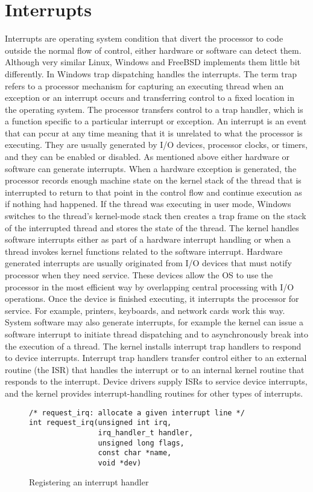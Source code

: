 \documentclass[letterpaper,10pt,draftclsnofoot,onecolumn]{IEEEtran}
\begin{document}
\section*{Interrupts}
Interrupts are operating system condition that divert the processor to code outside the normal flow of control, either hardware or software can detect them. Although very similar Linux, Windows and FreeBSD implements them little bit differently. 
In Windows trap dispatching handles the interrupts. The term trap refers to a processor mechanism for capturing an executing thread when an exception or an interrupt occurs and transferring control to a fixed location in the operating system. The processor transfers control to a trap handler, which is a function specific to a particular interrupt or exception.\cite{[1]}
An interrupt is an event that can pccur at any time meaning that it is unrelated to what the processor is executing. They are usually generated by I/O devices, processor clocks, or timers, and they can be enabled or disabled. As mentioned above either hardware or software can generate interrupts.
When a hardware exception is generated, the processor records enough machine state on the kernel stack of the thread that is interrupted to return to that point in the control flow and continue execution as if nothing had happened. If the thread was executing in user mode, Windows switches to the thread's kernel-mode stack then creates a trap frame on the stack of the interrupted thread and stores the state of the thread.\cite{[1]}
The kernel handles software interrupts either as part of a hardware interrupt handling or when a thread invokes kernel functions related to the software interrupt.
Hardware generated interrupts are usually originated from I/O devices that must notify processor when they need service. These devices allow the OS to use the processor in the most efficient way by overlapping central processing with I/O operations. Once the device is finished executing, it interrupts the processor for service. For example, printers, keyboards, and network cards work this way. System software may also generate interrupts, for example the kernel can issue a software interrupt to initiate thread dispatching and to asynchronously break into the execution of a thread.
The kernel installs interrupt trap handlers to respond to device interrupts. Interrupt trap handlers transfer control either to an external routine (the ISR) that handles the interrupt or to an internal kernel routine that responds to the interrupt. Device drivers supply ISRs to service device interrupts, and the kernel provides interrupt-handling routines for other types of interrupts.\cite{[1]}
\begin{figure}[H]
\caption{Registering an interrupt handler}
\begin{lstlisting}
/* request_irq: allocate a given interrupt line */
int request_irq(unsigned int irq,
				irq_handler_t handler,
				unsigned long flags,
				const char *name,
				void *dev)
\end{lstlisting} \cite{linux}
\end{figure}
\end{document}
